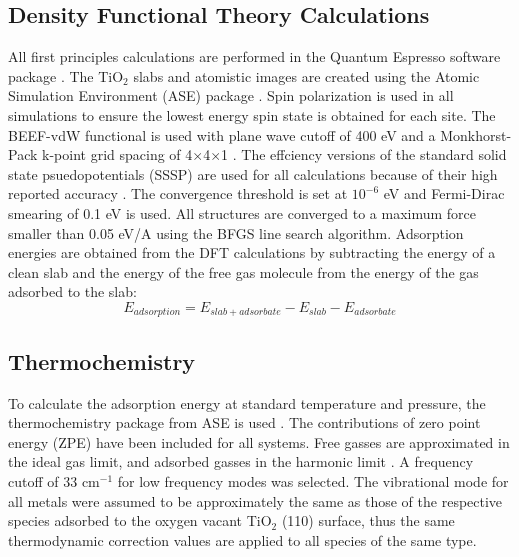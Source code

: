 \subsection{Density Functional Theory Calculations}
All first principles calculations are performed in the Quantum Espresso software package \cite{QE-2009}.
The TiO$_2$ slabs and atomistic images are created using the Atomic Simulation Environment (ASE) package \cite{Hjorth_Larsen_2017}.  Spin polarization is used in all simulations to ensure the lowest energy spin state is obtained for each site. The BEEF-vdW functional \cite{Wellendorff_2012} is used with plane wave cutoff of 400 eV and a Monkhorst-Pack k-point grid spacing of 4$\times$4$\times$1 \cite{Monkhorst_1976}. The effciency versions of the standard solid state psuedopotentials \cite{SSSP_pseudos} (SSSP) are used for all calculations because of their high reported accuracy \cite{Lejaeghereaad3000}. The convergence threshold is set at $10^{-6}$ eV and Fermi-Dirac smearing of 0.1 eV is used. All structures are converged to a maximum force smaller than 0.05 eV/A using the BFGS line search algorithm. Adsorption energies are obtained from the DFT calculations by subtracting the energy of a clean slab and the energy of the free gas molecule from the energy of the gas adsorbed to the slab:
\begin{equation}
E_{adsorption} = E_{slab+adsorbate} - E_{slab} - E_{adsorbate}
\end{equation}

\subsection{Thermochemistry}

To calculate the adsorption energy at standard temperature and pressure, the thermochemistry package from ASE is used \cite{ase-paper}. The contributions of zero point energy (ZPE) have been included for all systems. Free gasses are approximated in the ideal gas limit, and adsorbed gasses in the harmonic limit \cite{Reuter_2005}. A frequency cutoff of 33 cm$^{-1}$ for low frequency modes was selected. The vibrational mode for all metals were assumed to be approximately the same as those of the respective species adsorbed to the oxygen vacant TiO$_2$ (110) surface, thus the same thermodynamic correction values are applied to all species of the same type.

